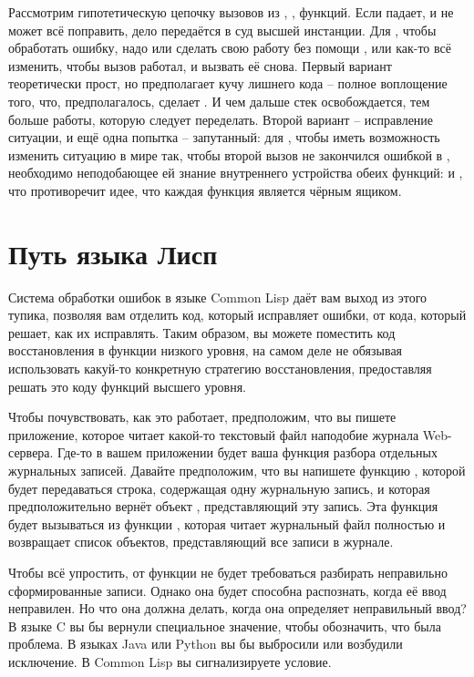 Рассмотрим гипотетическую цепочку вызовов из , , 
функций. Если  падает, и  не может всё поправить, дело
передаётся в суд высшей инстанции. Для , чтобы обработать ошибку, надо или
сделать свою работу без помощи , или как-то всё изменить, чтобы вызов
 работал, и вызвать её снова. Первый вариант теоретически прост, но
предполагает кучу лишнего кода -- полное воплощение того, что, предполагалось, сделает
. И чем дальше стек освобождается, тем больше работы, которую следует
переделать. Второй вариант -- исправление ситуации, и ещё одна попытка -- запутанный: для
, чтобы иметь возможность изменить ситуацию в мире так, чтобы второй вызов
 не закончился ошибкой в , необходимо неподобающее ей знание
внутреннего устройства обеих функций:  и , что противоречит
идее, что каждая функция является чёрным ящиком.

\section{Путь языка Лисп}

Система обработки ошибок в языке Common Lisp даёт вам выход из этого тупика, позволяя вам
отделить код, который исправляет ошибки, от кода, который решает, как их исправлять. Таким
образом, вы можете поместить код восстановления в функции низкого уровня, на самом деле не
обязывая использовать какуй-то конкретную стратегию восстановления, предоставляя решать
это коду функций высшего уровня.

Чтобы почувствовать, как это работает, предположим, что вы пишете приложение, которое
читает какой-то текстовый файл наподобие журнала Web-сервера. Где-то в вашем приложении
будет ваша функция разбора отдельных журнальных записей. Давайте предположим, что вы
напишете функцию , которой будет передаваться строка, содержащая
одну журнальную запись, и которая предположительно вернёт объект ,
представляющий эту запись. Эта функция будет вызываться из функции ,
которая читает журнальный файл полностью и возвращает список объектов, представляющий все
записи в журнале.

Чтобы всё упростить, от функции  не будет требоваться разбирать
неправильно сформированные записи. Однако она будет способна распознать, когда её ввод
неправилен. Но что она должна делать, когда она определяет неправильный ввод? В языке C вы
бы вернули специальное значение, чтобы обозначить, что была проблема. В языках Java или
Python вы бы выбросили или возбудили исключение. В Common Lisp вы сигнализируете условие.

